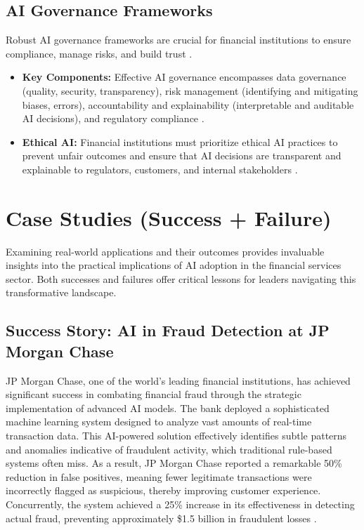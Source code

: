 \subsection{AI Governance Frameworks}
Robust AI governance frameworks are crucial for financial institutions to ensure compliance, manage risks, and build trust \cite{VerityAI_AIGovernance}.
\begin{itemize}
    \item \textbf{Key Components:} Effective AI governance encompasses data governance (quality, security, transparency), risk management (identifying and mitigating biases, errors), accountability and explainability (interpretable and auditable AI decisions), and regulatory compliance \cite{JackHenry_AIGovernance}.
    \item \textbf{Ethical AI:} Financial institutions must prioritize ethical AI practices to prevent unfair outcomes and ensure that AI decisions are transparent and explainable to regulators, customers, and internal stakeholders \cite{Ideas2IT_AIGovernance, HolisticAI_AIGovernance}.
\end{itemize}

\section{Case Studies (Success + Failure)}

Examining real-world applications and their outcomes provides invaluable insights into the practical implications of AI adoption in the financial services sector. Both successes and failures offer critical lessons for leaders navigating this transformative landscape.

\subsection{Success Story: AI in Fraud Detection at JP Morgan Chase}
JP Morgan Chase, one of the world's leading financial institutions, has achieved significant success in combating financial fraud through the strategic implementation of advanced AI models. The bank deployed a sophisticated machine learning system designed to analyze vast amounts of real-time transaction data. This AI-powered solution effectively identifies subtle patterns and anomalies indicative of fraudulent activity, which traditional rule-based systems often miss. As a result, JP Morgan Chase reported a remarkable 50\% reduction in false positives, meaning fewer legitimate transactions were incorrectly flagged as suspicious, thereby improving customer experience. Concurrently, the system achieved a 25\% increase in its effectiveness in detecting actual fraud, preventing approximately \$1.5 billion in fraudulent losses \cite{Medium_JPMC_Fraud, FinanceFeeds_JPMC_Fraud}.

